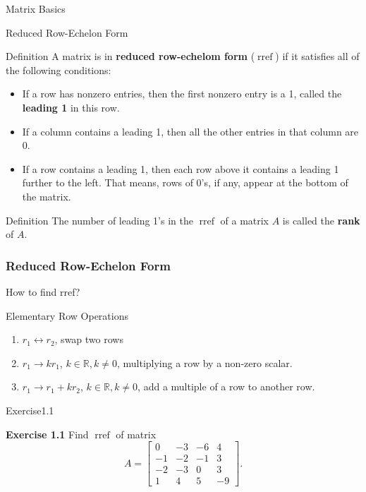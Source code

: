 \documentclass{beamer}
\begin{document}
\begin{section}{Matrix Basics}
\begin{frame}[label=6]{Reduced Row-Echelon Form}
        \begin{block}{Definition} 
        A matrix is in \textbf{reduced row-echelom form} ($\operatorname{rref}$) if it satisfies all of the following conditions: 
        \begin{itemize}
            \item If a row has nonzero entries, then the first nonzero entry is a 1, called the \textbf{leading 1} in this row. 
            \item If a column contains a leading 1, then all the other entries in that column are 0. 
            \item If a row contains a leading 1, then each row above it contains a leading 1 further to the left. That means, rows of 0's, if any, appear at the bottom of the matrix. 
        \end{itemize}
        \end{block}

        \begin{block}{Definition} The number of leading 1's in the  $\operatorname{rref}$ of a matrix $A$ is called the \textbf{rank} of $A$.
        \end{block}
\end{frame}

\begin{frame}
 \frametitle{Reduced Row-Echelon Form}
  How to find rref?
  \pause
  \begin{block}{Elementary Row Operations}
    \begin{enumerate}
        \item $r_1 \leftrightarrow r_2$, swap two rows
        \item  $r_1 \rightarrow kr_1$, $k\in \mathbb{R},k\neq0$, multiplying a row by a non-zero scalar.
        \item  $r_1 \rightarrow r_1+kr_2$, $k\in \mathbb{R},k\neq0$, add a multiple of a row to another row.
    \end{enumerate}   
  \end{block}
\end{frame}

\begin{frame}{Exercise1.1}
        \par \textbf{Exercise 1.1} Find $\operatorname{rref}$ of matrix $$A = \left[ \begin{array}{cccc} 0&-3&-6&4 \\ -1&-2&-1&3 \\ -2&-3&0&3 \\ 1&4&5&-9 \end{array}\right].$$


\end{frame}
\end{section}
\end{document}
